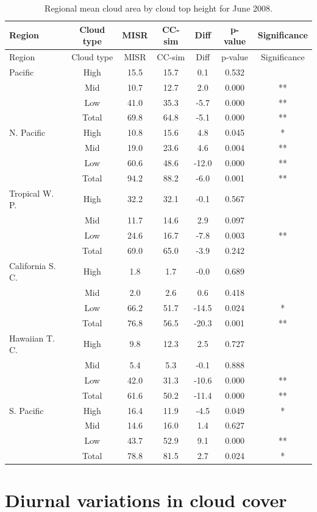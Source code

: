 \begin{longtable}[]{@{}lcccccc@{}}
\caption{\label{tbl:misr_cldmisr_table_june}Regional mean cloud area by
cloud top height for June 2008. }\tabularnewline
\toprule
Region & Cloud type & MISR & CC-sim & Diff & p-value &
Significance\tabularnewline
\midrule
\endfirsthead
\toprule
Region & Cloud type & MISR & CC-sim & Diff & p-value &
Significance\tabularnewline
\midrule
\endhead
Pacific & High & 15.5 & 15.7 & 0.1 & 0.532 &\tabularnewline
& Mid & 10.7 & 12.7 & 2.0 & 0.000 & **\tabularnewline
& Low & 41.0 & 35.3 & -5.7 & 0.000 & **\tabularnewline
& Total & 69.8 & 64.8 & -5.1 & 0.000 & **\tabularnewline
N. Pacific & High & 10.8 & 15.6 & 4.8 & 0.045 & *\tabularnewline
& Mid & 19.0 & 23.6 & 4.6 & 0.004 & **\tabularnewline
& Low & 60.6 & 48.6 & -12.0 & 0.000 & **\tabularnewline
& Total & 94.2 & 88.2 & -6.0 & 0.001 & **\tabularnewline
Tropical W. P. & High & 32.2 & 32.1 & -0.1 & 0.567 &\tabularnewline
& Mid & 11.7 & 14.6 & 2.9 & 0.097 &\tabularnewline
& Low & 24.6 & 16.7 & -7.8 & 0.003 & **\tabularnewline
& Total & 69.0 & 65.0 & -3.9 & 0.242 &\tabularnewline
California S. C. & High & 1.8 & 1.7 & -0.0 & 0.689 &\tabularnewline
& Mid & 2.0 & 2.6 & 0.6 & 0.418 &\tabularnewline
& Low & 66.2 & 51.7 & -14.5 & 0.024 & *\tabularnewline
& Total & 76.8 & 56.5 & -20.3 & 0.001 & **\tabularnewline
Hawaiian T. C. & High & 9.8 & 12.3 & 2.5 & 0.727 &\tabularnewline
& Mid & 5.4 & 5.3 & -0.1 & 0.888 &\tabularnewline
& Low & 42.0 & 31.3 & -10.6 & 0.000 & **\tabularnewline
& Total & 61.6 & 50.2 & -11.4 & 0.000 & **\tabularnewline
S. Pacific & High & 16.4 & 11.9 & -4.5 & 0.049 & *\tabularnewline
& Mid & 14.6 & 16.0 & 1.4 & 0.627 &\tabularnewline
& Low & 43.7 & 52.9 & 9.1 & 0.000 & **\tabularnewline
& Total & 78.8 & 81.5 & 2.7 & 0.024 & *\tabularnewline
\bottomrule
\end{longtable}

\section{Diurnal variations in cloud cover}\label{sec:misrDiurnal}


